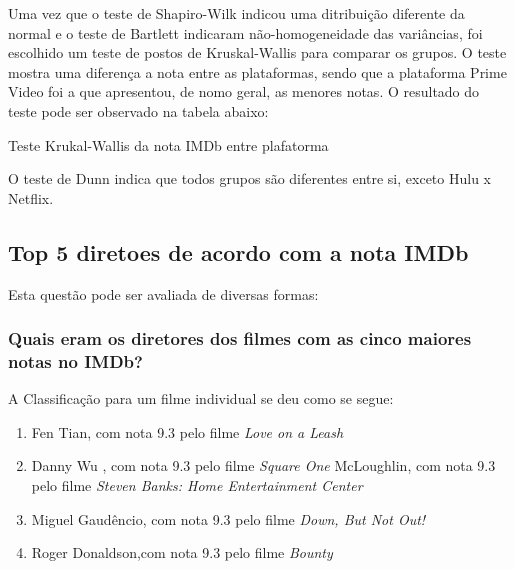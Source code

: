 \documentclass[a4paper, 12pt]{article} %
\begin{document}
Uma vez que o teste de Shapiro-Wilk indicou uma ditribuição diferente da normal e o teste de Bartlett indicaram não-homogeneidade das variâncias, foi escolhido um teste de postos de Kruskal-Wallis para comparar os grupos. O teste mostra uma diferença a nota entre as plataformas, sendo que a plataforma Prime Video foi a que apresentou, de nomo geral, as menores notas. O resultado do teste pode ser observado na tabela abaixo:


\begin{quadro}[H]
\centering
\caption{Teste Krukal-Wallis da nota IMDb entre plafatorma }
\label{R-Q-Teste-1}
\vspace{0.1cm}
\end{quadro}

O teste de Dunn indica que todos grupos são diferentes entre si, exceto Hulu x Netflix.

\subsection {Top 5 diretoes de acordo com a nota IMDb}

Esta questão pode ser avaliada de diversas formas:

\subsubsection{Quais eram os diretores dos filmes com as cinco maiores notas no IMDb?}

A Classificação para um filme individual se deu como se segue:\\

\begin{enumerate}[topsep=0pt,partopsep=0pt]
\item Fen Tian, com nota 9.3 pelo filme \emph{ Love on a Leash}
\item Danny Wu , com nota 9.3  pelo filme \emph{Square One}  
\itemTom McLoughlin, com nota  9.3 pelo filme \emph{Steven Banks: Home Entertainment Center}
\item Miguel Gaudêncio, com nota  9.3 pelo filme \emph{Down, But Not Out!}            
\item Roger Donaldson,com nota  9.3 pelo filme \emph{Bounty}      
\end{enumerate}
\end{document}
